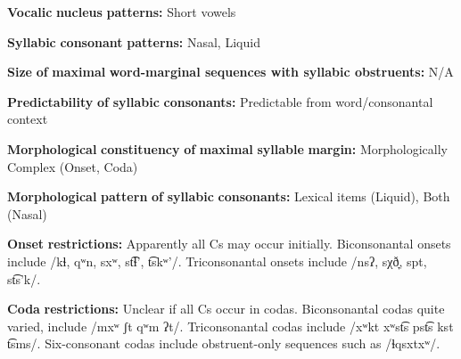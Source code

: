 \documentclass[output=paper]{langsci/langscibook}
\begin{document}
\begin{styleBody}
\textbf{Vocalic} \textbf{nucleus} \textbf{patterns:} Short vowels
\end{styleBody}

\begin{styleBody}
\textbf{Syllabic} \textbf{consonant} \textbf{patterns:} Nasal, Liquid
\end{styleBody}

\begin{styleBody}
\textbf{Size} \textbf{of} \textbf{maximal} \textbf{word{}-marginal sequences with syllabic obstruents:} N/A
\end{styleBody}

\begin{styleBody}
\textbf{Predictability} \textbf{of} \textbf{syllabic} \textbf{consonants:} Predictable from word/consonantal context
\end{styleBody}

\begin{styleBody}
\textbf{Morphological} \textbf{constituency} \textbf{of} \textbf{maximal} \textbf{syllable} \textbf{margin:} Morphologically Complex (Onset, Coda)
\end{styleBody}

\begin{styleBody}
\textbf{Morphological} \textbf{pattern} \textbf{of} \textbf{syllabic} \textbf{consonants:} Lexical items (Liquid), Both (Nasal)
\end{styleBody}

\begin{styleBody}
\textbf{Onset} \textbf{restrictions:} Apparently all Cs may occur initially. Biconsonantal onsets include /kɬ, qʷn, sxʷ, st͡ɬ’, t͡skʷ’/. Triconsonantal onsets include /nsʔ, sχð̞, spt, st͡s’k/.
\end{styleBody}

\begin{styleBody}
\textbf{Coda} \textbf{restrictions:} Unclear if all Cs occur in codas. Biconsonantal codas quite varied, include /mxʷ ʃt qʷm ʔt/. Triconsonantal codas include /xʷkt xʷst͡s pst͡s kst t͡sms/. Six-consonant codas include obstruent-only sequences such as /ɬqsxtxʷ/.
\end{styleBody}
\end{document}
